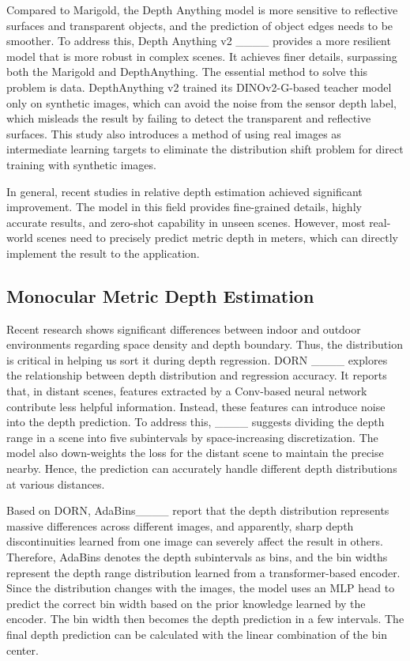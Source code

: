 Compared to Marigold, the Depth Anything model is more sensitive to reflective surfaces and transparent objects, and the prediction of object edges needs to be smoother. To address this, Depth Anything v2 ____ provides a more resilient model that is more robust in complex scenes. It achieves finer details, surpassing both the Marigold and DepthAnything. The essential method to solve this problem is data. DepthAnything v2 trained its DINOv2-G-based teacher model only on synthetic images, which can avoid the noise from the sensor depth label, which misleads the result by failing to detect the transparent and reflective surfaces. This study also introduces a method of using real images as intermediate learning targets to eliminate the distribution shift problem for direct training with synthetic images.

In general, recent studies in relative depth estimation achieved significant improvement. The model in this field provides fine-grained details, highly accurate results, and zero-shot capability in unseen scenes. However, most real-world scenes need to precisely predict metric depth in meters, which can directly implement the result to the application.
    
\subsection{Monocular Metric Depth Estimation}
Recent research shows significant differences between indoor and outdoor environments regarding space density and depth boundary. Thus, the distribution is critical in helping us sort it during depth regression. DORN ____ explores the relationship between depth distribution and regression accuracy. It reports that, in distant scenes, features extracted by a Conv-based neural network contribute less helpful information. Instead, these features can introduce noise into the depth prediction.
To address this, ____ suggests dividing the depth range in a scene into five subintervals by space-increasing discretization. The model also down-weights the loss for the distant scene to maintain the precise nearby. Hence, the prediction can accurately handle different depth distributions at various distances.

Based on DORN, AdaBins____ report that the depth distribution represents massive differences across different images, and apparently, sharp depth discontinuities learned from one image can severely affect the result in others. Therefore, AdaBins denotes the depth subintervals as bins, and the bin widths represent the depth range distribution learned from a transformer-based encoder. Since the distribution changes with the images, the model uses an MLP head to predict the correct bin width based on the prior knowledge learned by the encoder. The bin width then becomes the depth prediction in a few intervals. The final depth prediction can be calculated with the linear combination of the bin center.

